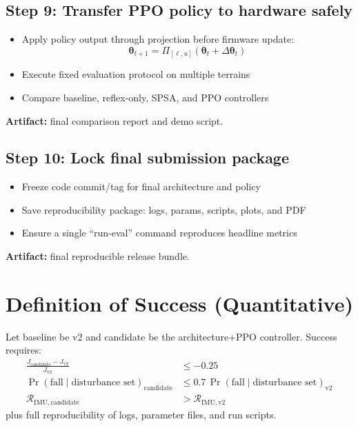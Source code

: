 \documentclass[11pt]{article}
\begin{document}
\subsection*{Step 9: Transfer PPO policy to hardware safely}
\begin{itemize}
    \item Apply policy output through projection before firmware update:
    \[
    \boldsymbol{\theta}_{t+1}=\Pi_{[\ell,u]}(\boldsymbol{\theta}_{t}+\Delta\boldsymbol{\theta}_t)
    \]
    \item Execute fixed evaluation protocol on multiple terrains
    \item Compare baseline, reflex-only, SPSA, and PPO controllers
\end{itemize}
\textbf{Artifact:} final comparison report and demo script.

\subsection*{Step 10: Lock final submission package}
\begin{itemize}
    \item Freeze code commit/tag for final architecture and policy
    \item Save reproducibility package: logs, params, scripts, plots, and PDF
    \item Ensure a single ``run-eval'' command reproduces headline metrics
\end{itemize}
\textbf{Artifact:} final reproducible release bundle.

\section{Definition of Success (Quantitative)}

Let baseline be v2 and candidate be the architecture+PPO controller. Success requires:
\begin{align}
\frac{J_{\mathrm{candidate}}-J_{\mathrm{v2}}}{J_{\mathrm{v2}}} &\le -0.25\\
\Pr(\mathrm{fall}\mid \text{disturbance set})_{\mathrm{candidate}} &\le 0.7\,
\Pr(\mathrm{fall}\mid \text{disturbance set})_{\mathrm{v2}}\\
\mathcal{R}_{\mathrm{IMU,candidate}} &> \mathcal{R}_{\mathrm{IMU,v2}}
\end{align}
plus full reproducibility of logs, parameter files, and run scripts.
\end{document}
